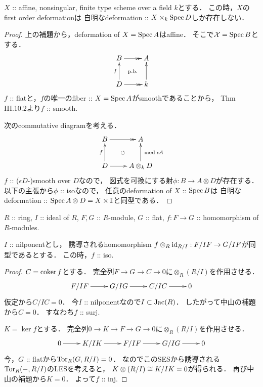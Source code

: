 \documentclass[a4paper]{jsarticle}
\makeatletter
\newcommand{\dualnum}{\mathbb{I}}
\newcommand{\famX}{\mathcal{X}}
\newcommand{\centerpb}{\ar@{}[lu]|{\text{p.b.}}}
\makeatother
\begin{document}
    \begin{Lemma}\label{thm:aff_is_rigid}
        $X$ :: affine, nonsingular, finite type scheme over a field $k$とする．
        この時，$X$のfirst order deformationは
        自明なdeformation :: $X \times_k \Spec D$しか存在しない．
    \end{Lemma}
    \begin{proof}
        上の補題から，deformation of $X=\Spec A$はaffine．
        そこで$\famX=\Spec B$とする．
        \[\vcenter{\xymatrix{
            B \ar@{->>}[r]& A \\
            D \ar@{->>}[r] \ar[u]^-{f}& k \ar[u]
            \centerpb
        }}\]
        $f$ :: flatと，$f$の唯一のfiber :: $X=\Spec A$がsmoothであることから，
        \cite{HarAG} Thm III.10.2より$f$ :: smooth.

        次のcommutative diagramを考える．
        \[\vcenter{\xymatrix{
            B \ar@{->>}[r]& A \\
            D \ar@{->}[r] \ar[u]^-{f}& A \otimes_{k} D \ar[u]_-{\bmod \epsilon A}
            \ar@{}[lu]|{\circlearrowleft}
        }}\]
        $f$ :: ($\epsilon D$-)smooth over $D$なので，
        図式を可換にする射$\phi: B \to A \otimes D$が存在する．
        以下の主張から$\phi$ :: isoなので，
        任意のdeformation of $X$ :: $\Spec B$は
        自明なdeformation :: $\Spec A \otimes D=X \times \dualnum$と同型である．
    \end{proof}

    \begin{Claim}
        $R$ :: ring,
        $I$ :: ideal of $R$,
        $F, G$ :: $R$-module, $G$ :: flat,
        $f: F \to G$ :: homomorphism of $R$-modules.

        $I$ :: nilponentとし，
        誘導されるhomomorphism
        $f \otimes_{R} \id[R/I]: F/IF \to G/IF$が同型であるとする．
        この時，$f$ :: iso.
    \end{Claim}
    \begin{proof}
        $C=\coker f$とする．
        完全列$F \to G \to C \to 0$に$\otimes_{R} (R/I)$を作用させる．
        \[\xymatrix{
            F/IF \ar[r]& G/IG \ar[r]& C/IC \ar[r]& 0
        }\]
        仮定から$C/IC=0$．
        今$I$ :: nilponentなので$I \subset \Jac(R)$．
        したがって中山の補題から$C=0$．
        すなわち$f$ :: surj.

        $K=\ker f$とする．
        完全列$0 \to K \to F \to G \to 0$に$\otimes_{R} (R/I)$を作用させる．
        \[\xymatrix{
                0 \ar[r]& K/IK \ar[r]& F/IF \ar[r]& G/IG \ar[r]& 0
        }\]
        今，$G$ :: flatから$\Tor_{R}(G, R/I)=0$．
        なのでこのSESから誘導される$\Tor_{R}(-, R/I)$のLESを考えると，
        $K \otimes(R/I) \iso K/IK=0$が得られる．
        再び中山の補題から$K=0$．
        よって$f$ :: inj.
    \end{proof}
\end{document}
